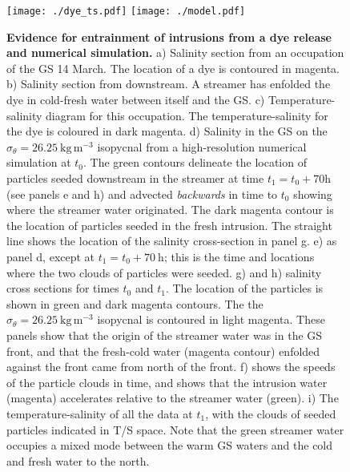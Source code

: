 \documentclass{natureJMK}
\begin{document}
\begin{figure}[htbp]
  \centering
    \texttt{[image: ./dye\_ts.pdf]}
    \texttt{[image: ./model.pdf]}
  \caption{{\bf Evidence for entrainment of intrusions from a dye release and numerical simulation.}
a) Salinity section from an occupation of the GS 14 March. The location of a dye is contoured in magenta.  b) Salinity section from downstream.  A streamer has enfolded the dye in cold-fresh water between itself and the GS.  c) Temperature-salinity diagram for this occupation.  The temperature-salinity for the dye is coloured in dark magenta.  
d) Salinity in the GS on the $\sigma_{\theta}=26.25\  \mathrm{kg\,m^{-3}}$ isopycnal from a high-resolution numerical simulation at $t_0$.  The green contours delineate the location of particles seeded downstream in the streamer at time $t_1=t_0+70 \mathrm{h}$ (see panels e and h) and advected \emph{backwards} in time to $t_0$ showing where the streamer water originated. The dark magenta contour is the location of particles seeded in the fresh intrusion.  The straight line shows the location of the salinity cross-section in panel g.  e) as panel d, except at $t_1=t_0+70\ \mathrm{h}$; this is the time and locations where the two clouds of particles were seeded.  g) and h) salinity cross sections for times $t_0$ and $t_1$.  The location of the particles is shown in green and dark magenta contours.  The the $\sigma_{\theta}=26.25\  \mathrm{kg\,m^{-3}}$ isopycnal is contoured in light magenta.  These panels show that the origin of the streamer water was in the GS front, and that the fresh-cold water (magenta contour) enfolded against the front came from north of the front.  f) shows the speeds of the particle clouds in time, and shows that the intrusion water (magenta) accelerates relative to the streamer water (green).  i) The temperature-salinity of all the data at $t_1$, with the clouds of seeded particles indicated in T/S space.  Note that the green streamer water occupies a  mixed mode between the warm GS waters and the cold and fresh water to the north.  
  } \label{fig:StreamersModel}
\end{figure}


\end{document}
